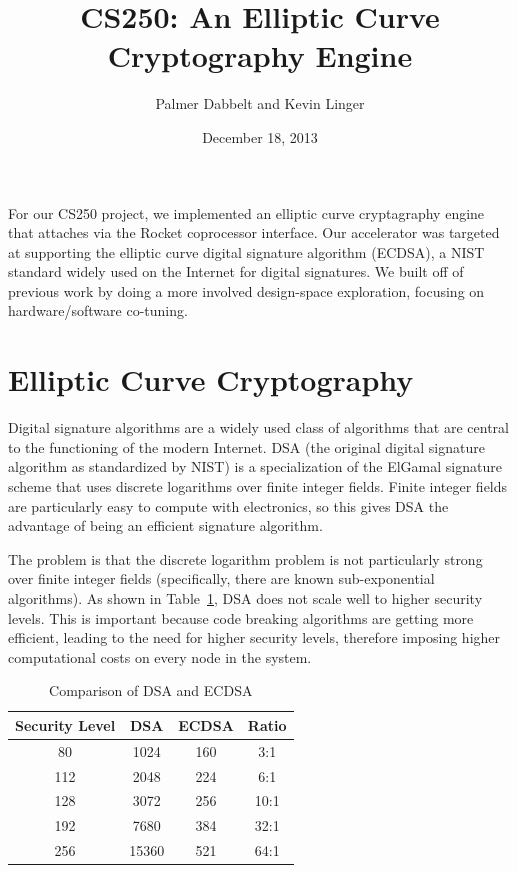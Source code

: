 \documentclass[twocolumn]{article}
\title{CS250: An Elliptic Curve Cryptography Engine}
\author{Palmer Dabbelt and Kevin Linger}
\date{December 18, 2013}
\begin{document}
\maketitle

For our CS250 project, we implemented an elliptic curve cryptagraphy
engine that attaches via the Rocket coprocessor interface.  Our
accelerator was targeted at supporting the elliptic curve digital
signature algorithm (ECDSA), a NIST standard widely used on the
Internet for digital signatures.  We built off of previous work by
doing a more involved design-space exploration, focusing on
hardware/software co-tuning.

\section{Elliptic Curve Cryptography}

Digital signature algorithms\cite{fips-186-3} are a widely used class
of algorithms that are central to the functioning of the modern
Internet.  DSA\cite{us-dsa} (the original digital signature algorithm
as standardized by NIST) is a specialization of the ElGamal signature
scheme\cite{elgamal-sig} that uses discrete logarithms over finite
integer fields.  Finite integer fields are particularly easy to
compute with electronics, so this gives DSA the advantage of being an
efficient signature algorithm.

The problem is that the discrete logarithm problem is not particularly
strong over finite integer fields (specifically, there are known
sub-exponential algorithms\cite{adleman-subexp}).  As shown in
Table~\ref{key-sizes}, DSA does not scale well to higher security
levels.  This is important because code breaking algorithms are
getting more efficient, leading to the need for higher security
levels, therefore imposing higher computational costs on every node in
the system. 

\begin{table}[h]
  \begin{center}
    \begin{tabular}{cccc}
      Security Level & DSA & ECDSA & Ratio \\
      \hline
      80 & 1024 & 160 & 3:1 \\
      112 & 2048 & 224 & 6:1 \\
      128 & 3072 & 256 & 10:1 \\
      192 & 7680 & 384 & 32:1 \\
      256 & 15360 & 521 & 64:1 \\
    \end{tabular}
  \end{center}

  \caption{Comparison of DSA and ECDSA\cite{nsa-case_for_ecc}
    \label{key-sizes}}
\end{table}
\end{document}
